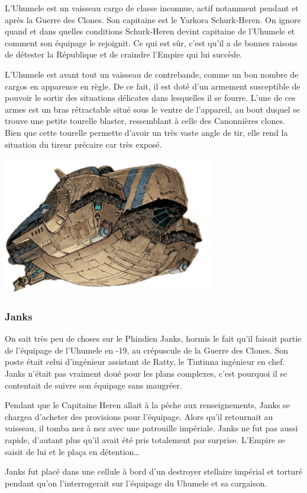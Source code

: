 L’Uhumele est un vaisseau cargo de classe inconnue, actif notamment pendant et après la Guerre des Clones. Son capitaine est le Yarkora Schurk-Heren. On ignore quand et dans quelles conditions Schurk-Heren devint capitaine de l’Uhumele et comment son équipage le rejoignit. Ce qui est sûr, c’est qu’il a de bonnes raisons de détester la République et de craindre l’Empire qui lui succède.

L’Uhumele est avant tout un vaisseau de contrebande, comme un bon nombre de cargos en apparence en règle. De ce fait, il est doté d’un armement susceptible de pouvoir le sortir des situations délicates dans lesquelles il se fourre. L’une de ces armes est un bras rétractable situé sous le ventre de l’appareil, au bout duquel se trouve une petite tourelle blaster, ressemblant à celle des Canonnières clones. Bien que cette tourelle permette d’avoir un très vaste angle de tir, elle rend la situation du tireur précaire car très exposé. 

\hspace{5\baselineskip}
\noindent\includegraphics[width=0.7\textwidth]{_img/uhumele.png}

\newpage
\vspace*{11\baselineskip}
\subsubsection{Janks}\label{sec:uhumele-janks}
On sait très peu de choses sur le Phindien Janks, hormis le fait qu’il faisait partie de l’équipage de l’Uhumele en -19, au crépuscule de la Guerre des Clones. Son poste était celui d’ingénieur assistant de Ratty, le Tintinna ingénieur en chef. Janks n’était pas vraiment doué pour les plans complexes, c’est pourquoi il se contentait de suivre son équipage sans maugréer.

Pendant que le Capitaine Heren allait à la pêche aux renseignements, Janks se chargea d’acheter des provisions pour l’équipage. Alors qu’il retournait au vaisseau, il tomba nez à nez avec une patrouille impériale. Janks ne fut pas aussi rapide, d’autant plus qu’il avait été pris totalement par surprise. L’Empire se saisit de lui et le plaça en détention\ldots

Janks fut placé dans une cellule à bord d’un destroyer stellaire impérial et torturé pendant qu’on l’interrogerait sur l’équipage du Uhumele et sa cargaison.
